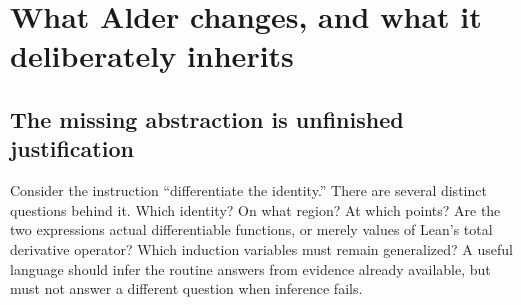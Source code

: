 \documentclass[11pt,a4paper]{article}
\newcommand{\Alder}{\textsc{Alder}}
\theoremstyle{plain}
\theoremstyle{definition}
\theoremstyle{remark}
\begin{document}
\begin{abstract}
A mathematician commonly suppresses a proof because its role is routine, not because its content is absent: a denominator is known to be invertible, an identity holds on a neighborhood, a construction preserves a specified invariant, or a finite calculation determines a universal claim within a proved fragment. The preceding brainstorm rounds correctly placed these obligations above Lean's kernel. Their two round-three syntheses also correctly identified the remaining problem: repeated agreement on refinements and contracts does not determine an inference algorithm or establish a useful authoring interface.

\Alder{} makes a narrower, operational proposal. A source expression carries a fixed mathematical interpretation, a proved property interface, and a dependent residual telescope. An unfinished derivation denotes a conditional proof, never an unconditional theorem. In a finite grounded Horn fragment, residual alternatives form antichains of missing-premise sets. The resulting algorithm is terminating, proof-producing, and complete for that fragment; its completeness does not extend to arbitrary Lean entailment. A complementary affine observation-frame theorem identifies circumstances in which a finite collection of \emph{realizable} observations decides a universal behavioral equality, including correlated observations and empty element types. The article gives detailed mathematical examples, conservative translations, a bounded grounding design, an implementation boundary, an explicit kernel-extension research agenda, and an evaluation plan that distinguishes new syntax from better libraries and automation.
\end{abstract}
\begingroup\small\setlength{\parskip}{0pt}\tableofcontents\endgroup
\clearpage
{}

\section{What Alder changes, and what it deliberately inherits}\label{sec:intent}

\subsection{The missing abstraction is unfinished justification}
Consider the instruction ``differentiate the identity.'' There are several distinct questions behind it. Which identity? On what region? At which points? Are the two expressions actual differentiable functions, or merely values of Lean's total derivative operator? Which induction variables must remain generalized? A useful language should infer the routine answers from evidence already available, but must not answer a different question when inference fails.
\end{document}

